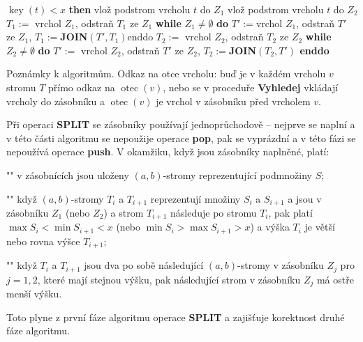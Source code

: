 \documentclass[a4paper,12pt]{article}
\DeclareMathOperator*{\otec}{otec}
\DeclareMathOperator*{\key}{key}
\begin{document}
\phantom{---}{\bf if} $\key(t)<x$ {\bf then}\newline 
\phantom{------}vlož podstrom vrcholu $t$ do $Z_1$\newline 
\phantom{---}{\bf else}\newline 
\phantom{------}vlož podstrom vrcholu $t$ do $Z_2$\newline 
\phantom{---}{\bf endif\newline 
endif}\newline 
$T_1:=\text{ vrchol }Z_1$, odstraň $T_1$ ze $Z_1$\newline 
{\bf while} $Z_1\ne\emptyset$ {\bf do}\newline 
\phantom{---}$T':=$vrchol $Z_1$, odstraň $T'$ ze $Z_1$, $T_1:=${\bf JOIN}$(T',T_1)$\newline enddo\newline 
$T_2:=\text{ vrchol }Z_2$, odstraň $T_2$ ze $Z_2$\newline 
{\bf while} $Z_2\ne\emptyset$ {\bf do}\newline 
$T':=\text{ vrchol }Z_2$, odstraň $T'$ ze $Z_2$, $T_2:=${\bf JOIN$(T_2,T')$\newline 
enddo}

Poznámky k algoritmům. \newline 
Odkaz na otce vrcholu: buď je v každém vrcholu $v$ 
stromu $T$ přímo odkaz na $\otec(v)$, nebo se v proceduře 
{\bf Vyhledej} vkláda\-jí vrcholy do zásobníku a $\otec
(v)$ 
je vrchol v zásobníku před vrcholem $v$.

Při operaci {\bf SPLIT} se zásobníky používají 
jednoprůchodově -- nejprve se naplní a v této části 
algoritmu se nepoužije operace {\bf pop}, pak se vyprázdní a v této 
fázi se nepoužívá operace {\bf push}. V okamžiku, když jsou 
zásobníky naplněné, platí:
\roster
\item"{}"
v zásobnících jsou uloženy $(a,b)$-stromy reprezentující 
podmnožiny $S$;
\item"{}" 
když $(a,b)$-stromy $T_i$ a $T_{i+1}$ reprezentují množiny $S_
i$ a $S_{i+1}$ a jsou v zá\-sobníku $Z_1$ (nebo $Z_2$) a strom $T_{i+1}$ následuje 
po stromu $T_{i}$, pak platí $\max S_i<\min S_{i+1}<x$ (nebo 
$\min S_i>\max S_{i+1}>x$) a výška $T_i$ je větší nebo 
rovna výšce $T_{i+1}$;
\item"{}"
když $T_i$ a $T_{i+1}$ jsou dva po sobě následující $
(a,b)$-stromy v 
zásobníku $Z_j$ pro $j=1,2$, které mají stejnou výšku, pak 
následující strom v zásobníku $Z_j$ má ostře menší výšku.
\endroster

Toto plyne z první fáze algoritmu operace {\bf SPLIT} a zajišťuje 
korektnost druhé fáze algoritmu. 
\end{document}
